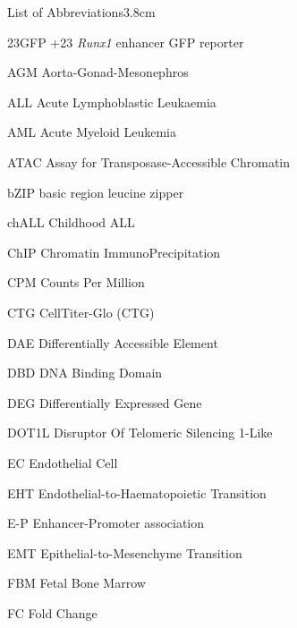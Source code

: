 \begin{mclistof}{List of Abbreviations}{3.8cm}

\item[23GFP] +23 \textit{Runx1} enhancer GFP reporter

\item[AGM] Aorta-Gonad-Mesonephros

\item[ALL] Acute Lymphoblastic Leukaemia

\item[AML] Acute Myeloid Leukemia

\item[ATAC] Assay for Transposase-Accessible Chromatin

\item[bZIP] basic region leucine zipper

\item[chALL] Childhood ALL

\item[ChIP] Chromatin ImmunoPrecipitation

\item[CPM] Counts Per Million

\item[CTG] CellTiter-Glo (CTG)

\item[DAE] Differentially Accessible Element

\item[DBD] DNA Binding Domain

\item[DEG] Differentially Expressed Gene

\item[DOT1L] Disruptor Of Telomeric Silencing 1-Like

\item[EC] Endothelial Cell

\item[EHT] Endothelial-to-Haematopoietic Transition

\item[E-P] Enhancer-Promoter association

\item[EMT] Epithelial-to-Mesenchyme Transition

\item[FBM] Fetal Bone Marrow

\item[FC] Fold Change


\end{mclistof}
